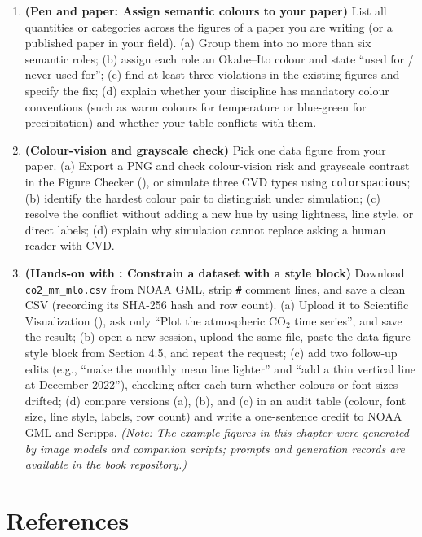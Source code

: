 \begin{enumerate}
\item \textbf{(Pen and paper: Assign semantic colours to your paper)} List all quantities or categories across the figures of a paper you are writing (or a published paper in your field). (a) Group them into no more than six semantic roles; (b) assign each role an Okabe--Ito colour and state ``used for / never used for''; (c) find at least three violations in the existing figures and specify the fix; (d) explain whether your discipline has mandatory colour conventions (such as warm colours for temperature or blue-green for precipitation) and whether your table conflicts with them.
\item \textbf{(Colour-vision and grayscale check)} Pick one data figure from your paper. (a) Export a PNG and check colour-vision risk and grayscale contrast in the \scidraw{} Figure Checker (), or simulate three CVD types using \texttt{colorspacious}; (b) identify the hardest colour pair to distinguish under simulation; (c) resolve the conflict without adding a new hue by using lightness, line style, or direct labels; (d) explain why simulation cannot replace asking a human reader with CVD.
\item \textbf{(Hands-on with \scidraw{}: Constrain a dataset with a style block)} Download \texttt{co2\_mm\_mlo.csv} from NOAA GML, strip \texttt{\#} comment lines, and save a clean CSV (recording its SHA-256 hash and row count). (a) Upload it to \scidraw{} Scientific Visualization (), ask only ``Plot the atmospheric $\text{CO}_2$ time series'', and save the result; (b) open a new session, upload the same file, paste the data-figure style block from Section 4.5, and repeat the request; (c) add two follow-up edits (e.g., ``make the monthly mean line lighter'' and ``add a thin vertical line at December 2022''), checking after each turn whether colours or font sizes drifted; (d) compare versions (a), (b), and (c) in an audit table (colour, font size, line style, labels, row count) and write a one-sentence credit to NOAA GML and Scripps. \textit{(Note: The example figures in this chapter were generated by image models and companion scripts; prompts and generation records are available in the book repository.)}
\end{enumerate}

\section*{References}

